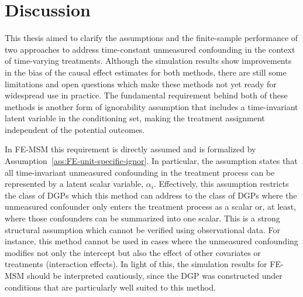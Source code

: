 \chapter{Discussion}
\label{chap:discussion}

This thesis aimed to clarify the assumptions and the finite-sample performance of two 
approaches to address 
time-constant unmeasured confounding in the context of time-varying treatments. 
Although the simulation results show improvements in the bias of the 
causal effect estimates for both methods, there are still some limitations and 
open questions which make these methods not yet ready for 
widespread use in practice. The fundamental requirement behind both 
of these methods is another form of ignorability assumption that includes 
a time-invariant latent variable in the conditioning set, making the treatment 
assignment independent of the potential outcomes.

In FE-MSM this requirement is directly assumed and is formalized by 
Assumption~\ref{ass:FE-unit-specific-ignor}. In particular, 
the assumption states that all time-invariant unmeasured confounding in 
the treatment process can be represented by a latent scalar variable, $\alpha_i$. 
Effectively, this assumption restricts the class 
of DGPs which this method can address to the class of DGPs where the unmeasured confounder 
only enters the treatment process as a scalar or, at least, where those confounders 
can be summarized 
into one scalar. This is a strong structural assumption which cannot be verified 
using observational data. For instance, this method cannot be used in cases where 
the unmeasured confounding modifies not only the intercept but also 
the effect of other covariates or treatments (interaction effects). 
In light of this, the simulation results for FE-MSM should be interpreted cautiously, since the DGP 
was constructed under conditions that are particularly well suited to this method.


